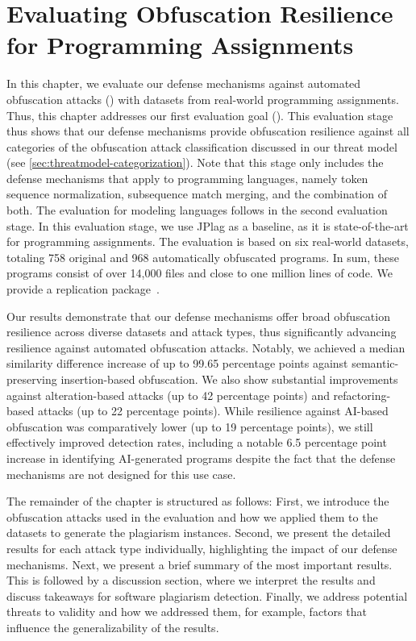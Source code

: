 \chapter[Evaluating Obfuscation Resilience]{Evaluating Obfuscation Resilience for Programming Assignments}\label{cha:code-eval}

In this chapter, we evaluate our defense mechanisms against automated obfuscation attacks () with datasets from real-world programming assignments. Thus, this chapter addresses our first evaluation goal ().
This evaluation stage thus shows that our defense mechanisms provide obfuscation resilience against all categories of the obfuscation attack classification discussed in our threat model (see \autoref{sec:threatmodel-categorization}). Note that this stage only includes the defense mechanisms that apply to programming languages, namely token sequence normalization, subsequence match merging, and the combination of both. The evaluation for modeling languages follows in the second evaluation stage.
In this evaluation stage, we use JPlag as a baseline, as it is state-of-the-art for programming assignments.
%
The evaluation is based on six real-world datasets, totaling 758 original and 968 automatically obfuscated programs.
In sum, these programs consist of over 14,000 files and close to one million lines of code.
We provide a replication package~.

Our results demonstrate that our defense mechanisms offer broad obfuscation resilience across diverse datasets and attack types, thus significantly advancing resilience against automated obfuscation attacks.
%
Notably, we achieved a median similarity difference increase of up to 99.65 percentage points against semantic-preserving insertion-based obfuscation. We also show substantial improvements against alteration-based attacks (up to 42 percentage points) and refactoring-based attacks (up to 22 percentage points). While resilience against AI-based obfuscation was comparatively lower (up to 19 percentage points), we still effectively improved detection rates, including a notable 6.5 percentage point increase in identifying AI-generated programs despite the fact that the defense mechanisms are not designed for this use case.

The remainder of the chapter is structured as follows:
First, we introduce the obfuscation attacks used in the evaluation and how we applied them to the datasets to generate the plagiarism instances.
Second, we present the detailed results for each attack type individually, highlighting the impact of our defense mechanisms.
Next, we present a brief summary of the most important results.
This is followed by a discussion section, where we interpret the results and discuss takeaways for software plagiarism detection.
Finally, we address potential threats to validity and how we addressed them, for example, factors that influence the generalizability of the results.


